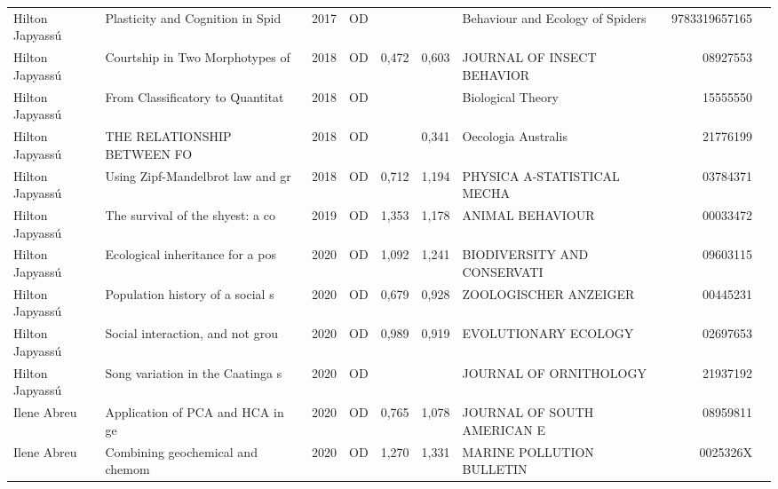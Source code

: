 \documentclass[12pt,brazil]{article}\usepackage[]{graphicx}\usepackage[]{xcolor}
\begin{document}
\begin{longtable}{lllrrllrr}
Hilton Japyassú & Plasticity and Cognition in Spid & 2017 & OD &  &  & Behaviour and Ecology of Spiders & 9783319657165 \\
Hilton Japyassú & Courtship in Two Morphotypes of  & 2018 & OD & 0,472 & 0,603 & JOURNAL OF INSECT BEHAVIOR & 08927553 \\
Hilton Japyassú & From Classificatory to Quantitat & 2018 & OD &  &  & Biological Theory & 15555550 \\
Hilton Japyassú & THE RELATIONSHIP BETWEEN FO & 2018 & OD &  & 0,341 & Oecologia Australis & 21776199 \\
\rowcolor{coautr}\rowcolor{coautr}\rowcolor{coautr}\rowcolor{coautr}\rowcolor{coautr}\rowcolor{coautr}\rowcolor{coautr}\rowcolor{coautr}\rowcolor{coautr}\rowcolor{coautr}\rowcolor{coautr}\rowcolor{coautr}\rowcolor{coautr}\rowcolor{coautr}\rowcolor{coautr}\rowcolor{coautr}Hilton Japyassú & Using Zipf-Mandelbrot law and gr & 2018 & OD & 0,712 & 1,194 & PHYSICA A-STATISTICAL MECHA & 03784371 \\
Hilton Japyassú & The survival of the shyest: a co & 2019 & OD & 1,353 & 1,178 & ANIMAL BEHAVIOUR & 00033472 \\
Hilton Japyassú & Ecological inheritance for a pos & 2020 & OD & 1,092 & 1,241 & BIODIVERSITY AND CONSERVATI & 09603115 \\
\rowcolor{coautr}\rowcolor{coautr}\rowcolor{coautr}\rowcolor{coautr}\rowcolor{coautr}\rowcolor{coautr}\rowcolor{coautr}\rowcolor{coautr}\rowcolor{coautr}\rowcolor{coautr}\rowcolor{coautr}\rowcolor{coautr}\rowcolor{coautr}\rowcolor{coautr}\rowcolor{coautr}\rowcolor{coautr}Hilton Japyassú & Population history of a social s & 2020 & OD & 0,679 & 0,928 & ZOOLOGISCHER ANZEIGER & 00445231 \\
Hilton Japyassú & Social interaction, and not grou & 2020 & OD & 0,989 & 0,919 & EVOLUTIONARY ECOLOGY & 02697653 \\
Hilton Japyassú & Song variation in the Caatinga s & 2020 & OD &  &  & JOURNAL OF ORNITHOLOGY & 21937192 \\
\rowcolor{coautr}\rowcolor{coautr}\rowcolor{coautr}\rowcolor{coautr}\rowcolor{coautr}\rowcolor{coautr}\rowcolor{coautr}\rowcolor{coautr}\rowcolor{coautr}\rowcolor{coautr}\rowcolor{coautr}\rowcolor{coautr}\rowcolor{coautr}\rowcolor{coautr}\rowcolor{coautr}\rowcolor{coautr}Ilene Abreu & Application of PCA and HCA in ge & 2020 & OD & 0,765 & 1,078 & JOURNAL OF SOUTH AMERICAN E & 08959811 \\
\rowcolor{coautr}\rowcolor{coautr}\rowcolor{coautr}\rowcolor{coautr}\rowcolor{coautr}\rowcolor{coautr}\rowcolor{coautr}\rowcolor{coautr}\rowcolor{coautr}\rowcolor{coautr}\rowcolor{coautr}\rowcolor{coautr}\rowcolor{coautr}\rowcolor{coautr}\rowcolor{coautr}\rowcolor{coautr}Ilene Abreu & Combining geochemical and chemom & 2020 & OD & 1,270 & 1,331 & MARINE POLLUTION BULLETIN & 0025326X \\

\end{longtable}
\end{document}
